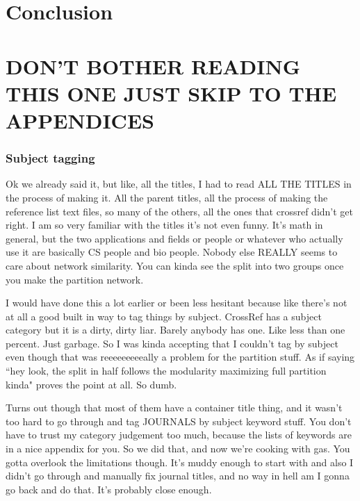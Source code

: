 \documentclass[12pt]{thesis}
\theoremstyle{plain}
\theoremstyle{definition}
\theoremstyle{remark}
\begin{document}








\chapter{Conclusion}
 















\chapter{DON'T BOTHER READING THIS ONE JUST SKIP TO THE APPENDICES}



 
\subsection{Subject tagging}

Ok we already said it, but like, all the titles, I had to read ALL THE TITLES in the process of making it. All the parent titles, all the process of making the reference list text files, so many of the others, all the ones that crossref didn't get right. I am so very familiar with the titles it's not even funny. It's math in general, but the two applications and fields or people or whatever who actually use it are basically CS people and bio people. Nobody else REALLY seems to care about network similarity. You can kinda see the split into two groups once you make the partition network.

I would have done this a lot earlier or been less hesitant because like there's not at all a good built in way to tag things by subject. CrossRef has a subject category but it is a dirty, dirty liar. Barely anybody has one. Like less than one percent. Just garbage. So I was kinda accepting that I couldn't tag by subject even though that was reeeeeeeeeally a problem for the partition stuff. As if saying ``hey look, the split in half follows the modularity maximizing full partition kinda" proves the point at all. So dumb. 

Turns out though that most of them have a container title thing, and it wasn't too hard to go through and tag JOURNALS by subject keyword stuff. You don't have to trust my category judgement too much, because the lists of keywords are in a nice appendix for you. So we did that, and now we're cooking with gas. You gotta overlook the limitations though. It's muddy enough to start with and also I didn't go through and manually fix journal titles, and no way in hell am I gonna go back and do that. It's probably close enough.
\end{document}
